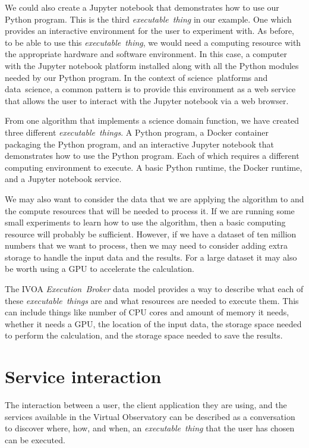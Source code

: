 \documentclass[11pt,a4paper]{ivoa}
\newcommand{\datamodel} {data~model}
\newcommand{\webservice} {web service}
\newcommand{\webbrowser} {web browser}
\newcommand{\vofull} {Virtual Observatory}
\newcommand{\ivoa} {IVOA}
\newcommand{\executionbroker} {\textit{Execution~Broker}}
\newcommand{\executablething}[1] {\textit{executable~thing#1}}
\newcommand{\jupyternotebook} {Jupyter notebook}
\newcommand{\python} {Python}
\newcommand{\pythonprogram} {Python program}
\newcommand{\dockerruntime} {Docker runtime}
\newcommand{\dockercontainer} {Docker container}
\newcommand{\dataset}[1] {dataset#1}
\newcommand{\datascience} {data~science}
\newcommand{\scienceplatform}[1] {science~platform#1}
\newcommand{\cpu}[1] {CPU#1}
\newcommand{\gpu}[1] {GPU#1}
\begin{document}
We could also create a \jupyternotebook{} that demonstrates how to use our \pythonprogram{}.
This is the third \executablething{} in our example.
One which provides an interactive environment for the user to experiment with.
As before, to be able to use this \executablething{}, we would need a computing resource with
the appropriate hardware and software environment.
In this case, a computer with the \jupyternotebook{} platform installed along with all the \python{} modules
needed by our \pythonprogram{}.
In the context of \scienceplatform{s} and \datascience{}, a common pattern is to provide this environment as a \webservice{}
that allows the user to interact with the \jupyternotebook{} via a \webbrowser.

From one algorithm that implements a science domain function, we have created three different \executablething{s}.
A \pythonprogram{}, a \dockercontainer{} packaging the \pythonprogram{}, and an interactive \jupyternotebook{}
that demonstrates how to use the \pythonprogram{}.
Each of which requires a different computing environment to execute.
A basic \python{} runtime, the \dockerruntime{}, and a \jupyternotebook{} service.

We may also want to consider the data that we are applying the algorithm to and the compute resources that
will be needed to process it.
If we are running some small experiments to learn how to use the algorithm, then a basic computing
resource will probably be sufficient.
However, if we have a \dataset{} of ten million numbers that we want to process, then we may
need to consider adding extra storage to handle the input data and the results.
For a large \dataset{} it may also be worth using a \gpu{} to accelerate the calculation.

The \ivoa{} \executionbroker{} \datamodel{} provides a way to describe what each of these \executablething{s}
are and what resources are needed to execute them.
This can include things like number of \cpu{} cores and amount of memory it needs,
whether it needs a \gpu{}, the location of the input data, the storage space needed to perform
the calculation, and the storage space needed to save the results.

\section{Service interaction}
\label{sect-service-interaction}

The interaction between a user, the client application they are using, and the services available in the \vofull{}
can be described as a conversation to discover where, how, and when, an \executablething{} that the user
has chosen can be executed.
\end{document}
